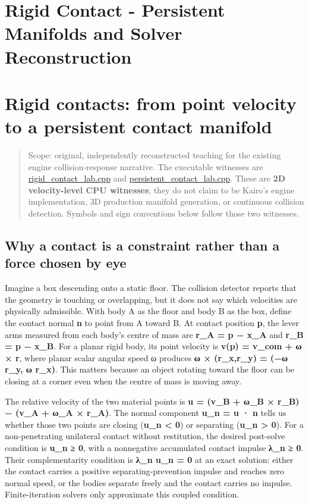 \hypertarget{appendix-c9d92e145503}{}
\section*{Rigid Contact - Persistent Manifolds and Solver Reconstruction}
\section{Rigid contacts: from point velocity to a persistent contact manifold}\label{appendix-c9d92e145503-rigid-contacts-from-point-velocity-to-a-persistent-contact-manifold}

\begin{quote}
Scope: original, independently reconstructed teaching for the existing engine collision-response narrative. The executable witnesses are \hyperref[source-file-103f7ae75398744dea475e34]{rigid\_contact\_lab.cpp} and \hyperref[source-file-44c320ffad9698c7abd453e2]{persistent\_contact\_lab.cpp}. These are \textbf{2D velocity-level CPU witnesses}; they do not claim to be Kairo's engine implementation, 3D production manifold generation, or continuous collision detection. Symbols and sign conventions below follow those two witnesses.
\end{quote}

\subsection{Why a contact is a constraint rather than a force chosen by eye}\label{appendix-c9d92e145503-why-a-contact-is-a-constraint-rather-than-a-force-chosen-by-eye}

Imagine a box descending onto a static floor. The collision detector reports that the geometry is touching or overlapping, but it does not say which velocities are physically admissible. With body A as the floor and body B as the box, define the contact normal \textbf{n} to point from A toward B. At contact position \textbf{p}, the lever arms measured from each body's centre of mass are \textbf{r\_A = p − x\_A} and \textbf{r\_B = p − x\_B}. For a planar rigid body, its point velocity is \textbf{v(p) = v\_com + ω × r}, where planar scalar angular speed ω produces \textbf{ω × (r\_x,r\_y) = (−ω r\_y, ω r\_x)}. This matters because an object rotating toward the floor can be closing at a corner even when the centre of mass is moving away.

The relative velocity of the two material points is \textbf{u = (v\_B + ω\_B × r\_B) − (v\_A + ω\_A × r\_A)}. The normal component \textbf{u\_n = u · n} tells us whether those two points are closing (\textbf{u\_n \textless{} 0}) or separating (\textbf{u\_n \textgreater{} 0}). For a non-penetrating unilateral contact without restitution, the desired post-solve condition is \textbf{u\_n ≥ 0}, with a nonnegative accumulated contact impulse \textbf{λ\_n ≥ 0}. Their complementarity condition is \textbf{λ\_n u\_n = 0} at an exact solution: either the contact carries a positive separating-prevention impulse and reaches zero normal speed, or the bodies separate freely and the contact carries no impulse. Finite-iteration solvers only approximate this coupled condition.

